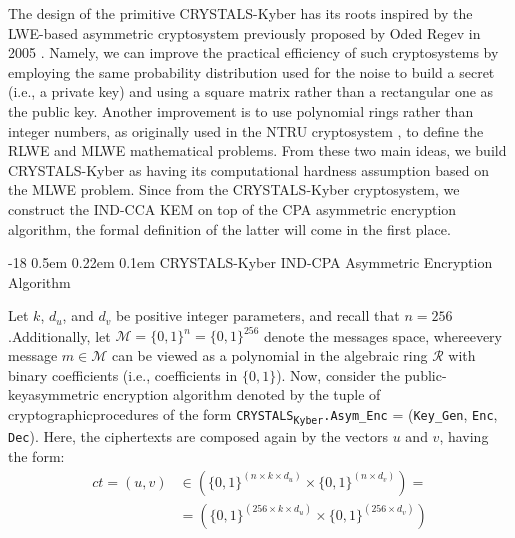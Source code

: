 \documentclass[runningheads]{llncs}
\makeatletter
\renewcommand\subsubsection{\@startsection{subsubsection}{3}{\z@}%
                       {-18\p@ \@plus -4\p@ \@minus -4\p@}%
                       {0.5em \@plus 0.22em \@minus 0.1em}%
                       {\normalfont\normalsize\bfseries\boldmath}}
\numberwithin{equation}{section}
\makeatother
\begin{document}
    \vspace{-3ex}
    \noindent The design of the primitive CRYSTALS-Kyber has its roots inspired by the LWE-based asymmetric cryptosystem previously proposed by Oded Regev in 2005 \cite{regev:on-lattices-learning-with-errors-random-linear-codes-and-cryptography:2005:06-2024}. Namely, we can improve the practical efficiency of such cryptosystems by employing the same probability distribution used for the noise to build a secret (i.e., a private key) and using a square matrix rather than a rectangular one as the public key. Another improvement is to use polynomial rings rather than integer numbers, as originally used in the NTRU cryptosystem \cite{hoffstein-pipher-silverman:ntru-ring-based-public-key-cryptosystem:1998:06-2024}, to define the RLWE and MLWE mathematical problems. From these two main ideas, we build CRYSTALS-Kyber as having its computational hardness assumption based on the MLWE problem. Since from the CRYSTALS-Kyber cryptosystem, we construct the IND-CCA KEM on top of the CPA asymmetric encryption algorithm, the formal definition of the latter will come in the first place.

    \vspace{-1ex}
    \subsubsection{CRYSTALS-Kyber IND-CPA Asymmetric Encryption\\ Algorithm}
    \label{subsubsec:crystals-kyber-ind-cpa-asymmetric-encryption-algorithm}

    Let $k$, ${d}_{u}$, and ${d}_{v}$ be positive integer parameters, and recall that $n = 256$.\break Additionally, let $\mathcal{M} = { \{ 0 , 1 \} }^{n} = { \{ 0 , 1 \} }^{256}$ denote the messages space, where\break every message $m \in \mathcal{M}$ can be viewed as a polynomial in the algebraic ring $\mathcal{R}$ with binary coefficients (i.e., coefficients in $\{ 0 , 1 \}$). Now, consider the public-key\break asymmetric encryption algorithm denoted by the tuple of cryptographic\break procedures of the form \texorpdfstring{\texttt{CRYSTALS}\textsubscript{\texttt{Kyber}}\texttt{.Asym\_Enc} = \big(\texttt{Key\_Gen}, \texttt{Enc}, \texttt{Dec}\big)}\/. Here, the ciphertexts are composed again by the vectors $u$ and $v$, having the form:
    \begin{equation*}
        \begin{split}
            ct = (u, v)& \in \left( { \{ 0, 1 \} }^{\left( n \times k \times {d}_{u} \right)} \times { \{ 0, 1 \} }^{\left( n \times {d}_{v} \right)} \right) = \\
            & = \left( { \{ 0, 1 \} }^{\left( 256 \times k \times {d}_{u} \right)} \times { \{ 0, 1 \} }^{\left( 256 \times {d}_{v} \right)} \right)
        \end{split}
    \end{equation*}
    
\end{document}
